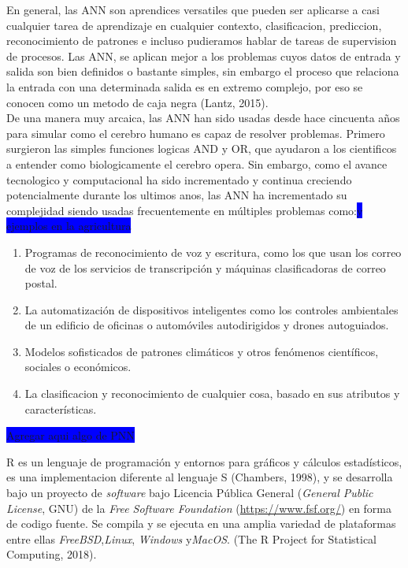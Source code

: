 En general, las ANN son aprendices versatiles que pueden ser aplicarse a casi cualquier tarea de aprendizaje en cualquier contexto, clasificacion, prediccion, reconocimiento de patrones e incluso pudieramos hablar de tareas de supervision de procesos. Las ANN, se aplican mejor a los problemas cuyos datos de entrada y salida son bien definidos o bastante simples, sin embargo el proceso que relaciona la entrada con una determinada salida es en extremo complejo, por eso se conocen como un metodo de caja negra (Lantz, 2015).\\

De una manera muy arcaica, las ANN han sido usadas desde hace cincuenta años para simular como el cerebro humano es capaz de resolver problemas. Primero surgieron las simples funciones logicas AND y OR, que ayudaron a los cientificos a entender como biologicamente el cerebro opera. Sin embargo, como el avance tecnologico y computacional ha sido incrementado y continua creciendo potencialmente durante los ultimos anos, las ANN ha incrementado su complejidad siendo usadas frecuentemente en múltiples problemas como:\colorbox{blue}{y ejemplos en la agricultura }

\begin{enumerate}
    \item{Programas de reconocimiento de voz y escritura, como los que usan los correo de voz
de los servicios de transcripción y máquinas clasificadoras de correo postal.}
	\item{La automatización de dispositivos inteligentes como los controles ambientales de un edificio de oficinas o automóviles autodirigidos y drones autoguiados.}
	\item{Modelos sofisticados de patrones climáticos y otros fenómenos científicos, sociales o económicos.}
	\item{La clasificacion y reconocimiento de cualquier cosa, basado en sus atributos y características.}
\end{enumerate} 

\colorbox{blue}{Agregar aqui algo de PNN}

R es un lenguaje de programación y entornos para gráficos y c\'alculos estad\'isticos, es una implementacion diferente al lenguaje S (Chambers, 1998), y se desarrolla bajo un proyecto de \textit{software} bajo Licencia Pública General (\textit{General Public License}, GNU) de la \textit{Free Software Foundation} (\url{https://www.fsf.org/}) en forma de codigo fuente. Se compila y se ejecuta en una amplia variedad de plataformas entre ellas \textit{FreeBSD},\textit{Linux}, \textit{Windows} y\textit{MacOS}. (The R Project for Statistical Computing, 2018).\\

